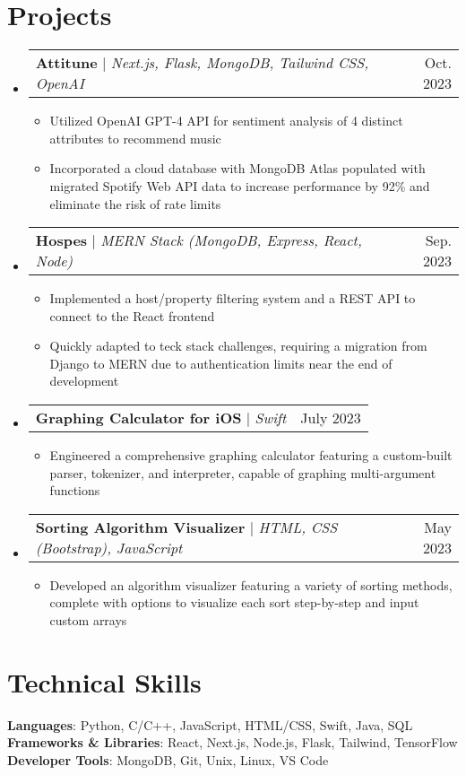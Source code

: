 \documentclass[letterpaper,12pt]{article}
\makeatletter
\newcommand{\resumeItem}[1]{
  \item\small{
    {#1 \vspace{-2pt}}
  }
}
\newcommand{\resumeProjectHeading}[2]{
    \item
    \begin{tabular*}{0.97\textwidth}{l@{\extracolsep{\fill}}r}
      \small#1 & #2 \\
    \end{tabular*}\vspace{-7pt}
}
\newcommand{\resumeSubHeadingListStart}{\begin{itemize}[leftmargin=0.15in, label={}]}
\newcommand{\resumeSubHeadingListEnd}{\end{itemize}}
\newcommand{\resumeItemListStart}{\begin{itemize}}
\newcommand{\resumeItemListEnd}{\end{itemize}\vspace{-5pt}}
\makeatother
\begin{document}
\section{Projects}
    \resumeSubHeadingListStart
      \resumeProjectHeading
          {\textbf{Attitune} $|$ \emph{Next.js, Flask, MongoDB, Tailwind CSS, OpenAI}}{Oct. 2023}
          \resumeItemListStart
            \resumeItem{Utilized OpenAI GPT-4 API for sentiment analysis of 4 distinct attributes to recommend
            music}
            \resumeItem{Incorporated a cloud database with MongoDB Atlas populated with migrated Spotify Web API data to increase performance by 92\% and eliminate the risk of rate limits}
          \resumeItemListEnd
      \resumeProjectHeading
          {\textbf{Hospes} $|$ \emph{MERN Stack (MongoDB, Express, React, Node)}}{Sep. 2023}
          \resumeItemListStart
            \resumeItem{Implemented a host/property filtering system and a REST API to connect to the React frontend}
            \resumeItem{Quickly adapted to teck stack challenges, requiring a migration from Django to MERN due to authentication limits near the end of development}
          \resumeItemListEnd
      \resumeProjectHeading
          {\textbf{Graphing Calculator for iOS} $|$ \emph{Swift}}{July 2023}
          \resumeItemListStart
            \resumeItem{Engineered a comprehensive graphing calculator featuring a custom-built parser, tokenizer, and interpreter, capable of graphing multi-argument functions}
          \resumeItemListEnd
      \resumeProjectHeading
          {\textbf{Sorting Algorithm Visualizer} $|$ \emph{HTML, CSS (Bootstrap), JavaScript}}{May 2023}
          \resumeItemListStart
            \resumeItem{Developed an algorithm visualizer featuring a variety of sorting methods, complete with options to visualize each sort step-by-step and input custom arrays}
          \resumeItemListEnd
    \resumeSubHeadingListEnd


\section{Technical Skills}
 \begin{itemize}[leftmargin=0.15in, label={}]
    \small{\item{
     \textbf{Languages}{: Python, C/C++, JavaScript, HTML/CSS, Swift, Java, SQL} \\
     \textbf{Frameworks \& Libraries}{: React, Next.js, Node.js, Flask, Tailwind, TensorFlow} \\
     \textbf{Developer Tools}{: MongoDB, Git, Unix, Linux, VS Code} \\
    }}
 \end{itemize}
\end{document}
